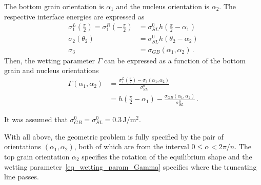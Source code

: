 	The bottom grain orientation is $\alpha_1$ and the nucleus orientation is $\alpha_2$. The respective interface energies are expressed as
	\begin{align}
		\label{eq_problemspec_sig1} \textstyle  \sigma_{1}^L\left(\frac{\pi}{2}\right)= \sigma_{1}^R\left(-\frac{\pi}{2}\right) &= \textstyle\sigma_{SL}^0h\left(\frac{\pi}{2}-\alpha_1\right) \\
		\label{eq_problemspec_sig2} \sigma_{2}(\theta_{2})&=\sigma_{SL}^0h(\theta_{2}-\alpha_2) \\
		\label{eq_problemspec_sig3} \sigma_{3} &= \sigma_{GB}(\alpha_1,\alpha_2) \,.
	\end{align}
	Then, the wetting parameter $\Gamma$ can be expressed as a function of the bottom grain and nucleus orientations
	\begin{align}
		\Gamma(\alpha_1,\alpha_2) &= \frac{\sigma_{1}^L(\frac{\pi}{2})-\sigma_{3}(\alpha_1,\alpha_2)}{\sigma_{SL}^0} \\
		&= h(\textstyle\frac{\pi}{2}-\alpha_1) -\displaystyle\frac{\sigma_{GB}(\alpha_1,\alpha_2)}{\sigma_{SL}^0} \,. \label{eq_wetting_param_Gamma}
	\end{align}
	
	It was assumed that $\sigma_{GB}^0=\sigma_{SL}^0=0.3\,\mathrm{J/m^2}$.
	
	With all above, the geometric problem is fully specified by the pair of orientations $(\alpha_1,\alpha_2)$, both of which are from the interval $0 \leq \alpha < 2\pi/n$. The top grain orientation $\alpha_2$ specifies the rotation of the equilibrium shape and the wetting parameter~\eqref{eq_wetting_param_Gamma} specifies where the truncating line passes.    
	
